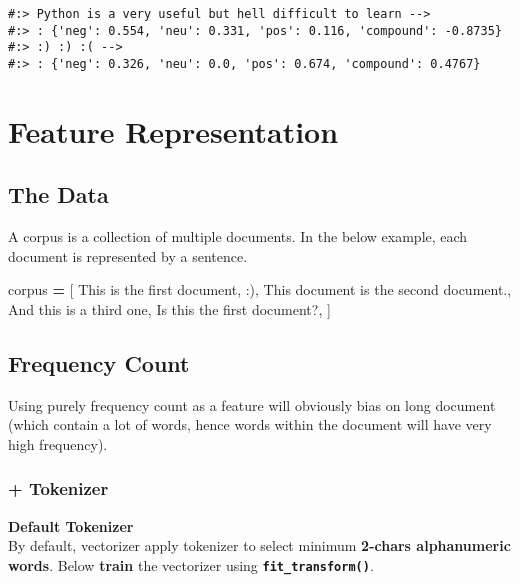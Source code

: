 \documentclass[
]{book}
\newenvironment{Shaded}{\begin{snugshade}}{\end{snugshade}}
\newcommand{\NormalTok}[1]{#1}
\newcommand{\OperatorTok}[1]{\textcolor[rgb]{0.43,0.43,0.43}{\textbf{#1}}}
\newcommand{\StringTok}[1]{\textcolor[rgb]{0.5,0.5,0.5}{#1}}
\begin{document}
\begin{verbatim}
#:> Python is a very useful but hell difficult to learn --> 
#:> : {'neg': 0.554, 'neu': 0.331, 'pos': 0.116, 'compound': -0.8735}
#:> :) :) :( --> 
#:> : {'neg': 0.326, 'neu': 0.0, 'pos': 0.674, 'compound': 0.4767}
\end{verbatim}

\hypertarget{feature-representation}{%
\section{Feature Representation}\label{feature-representation}}

\hypertarget{the-data-3}{%
\subsection{The Data}\label{the-data-3}}

A corpus is a collection of multiple documents. In the below example, each document is represented by a sentence.

\begin{Shaded}
\begin{Highlighting}[]
\NormalTok{corpus }\OperatorTok{=}\NormalTok{ [}
   \StringTok{\textquotesingle{}This is the first document, :)\textquotesingle{}}\NormalTok{,}
   \StringTok{\textquotesingle{}This document is the second document.\textquotesingle{}}\NormalTok{,}
   \StringTok{\textquotesingle{}And this is a third one\textquotesingle{}}\NormalTok{,}
   \StringTok{\textquotesingle{}Is this the first document?\textquotesingle{}}\NormalTok{,}
\NormalTok{]}
\end{Highlighting}
\end{Shaded}

\hypertarget{frequency-count-1}{%
\subsection{Frequency Count}\label{frequency-count-1}}

Using purely frequency count as a feature will obviously bias on long document (which contain a lot of words, hence words within the document will have very high frequency).

\hypertarget{tokenizer}{%
\subsubsection{+ Tokenizer}\label{tokenizer}}

\textbf{Default Tokenizer}\\
By default, vectorizer apply tokenizer to select minimum \textbf{2-chars alphanumeric words}. Below \textbf{train} the vectorizer using \textbf{\texttt{fit\_transform()}}.
\end{document}
